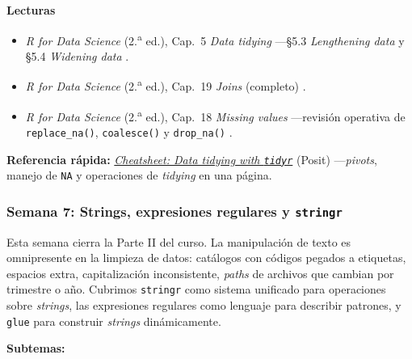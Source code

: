 \documentclass[11pt,letterpaper]{article}
\newcommand{\semana}[2]{%
  \subsubsection*{\color{main}Semana #1: #2}%
}
\newcommand{\cheatsheet}[2]{%
  \href{https://rstudio.github.io/cheatsheets/#1.pdf}{\textit{Cheatsheet: #2}}%
}
\begin{document}
\medskip
\noindent\textbf{Lecturas}
\begin{itemize}[leftmargin=*, itemsep=1pt]
    \item \textit{R for Data Science} (2.\textsuperscript{a} ed.), Cap.\ 5 \textit{Data tidying} ---§5.3 \textit{Lengthening data} y §5.4 \textit{Widening data} \cite{wickham2023r4ds}.
    \item \textit{R for Data Science} (2.\textsuperscript{a} ed.), Cap.\ 19 \textit{Joins} (completo) \cite{wickham2023r4ds}.
    \item \textit{R for Data Science} (2.\textsuperscript{a} ed.), Cap.\ 18 \textit{Missing values} ---revisión operativa de \texttt{replace\_na()}, \texttt{coalesce()} y \texttt{drop\_na()} \cite{wickham2023r4ds}.
\end{itemize}

\medskip
\noindent\textbf{Referencia rápida:} \cheatsheet{tidyr}{Data tidying with \texttt{tidyr}} (Posit) ---\textit{pivots}, manejo de \texttt{NA} y operaciones de \textit{tidying} en una página.

\semana{7}{Strings, expresiones regulares y \texttt{stringr}}

Esta semana cierra la Parte II del curso. La manipulación de texto es omnipresente en la limpieza de datos: catálogos con códigos pegados a etiquetas, espacios extra, capitalización inconsistente, \textit{paths} de archivos que cambian por trimestre o año. Cubrimos \texttt{stringr} como sistema unificado para operaciones sobre \textit{strings}, las expresiones regulares como lenguaje para describir patrones, y \texttt{glue} para construir \textit{strings} dinámicamente. 

\textbf{Subtemas:}
\end{document}
